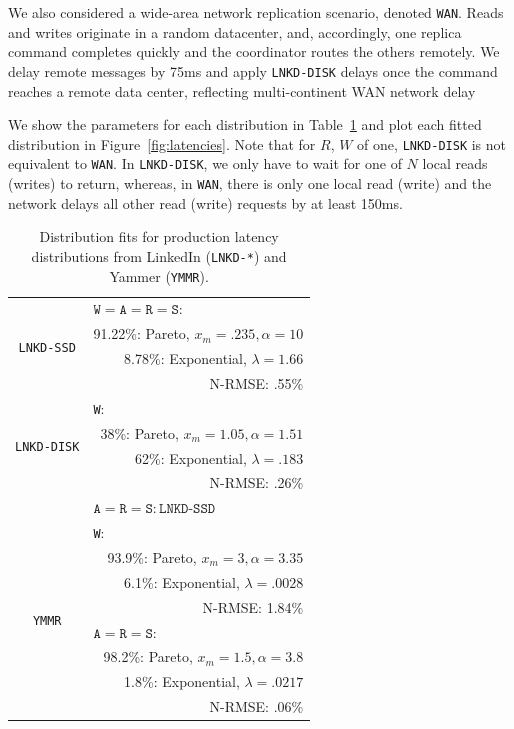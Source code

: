 \documentclass{vldb}
\begin{document}
We also considered a wide-area network replication scenario, denoted
\texttt{WAN}.  Reads and writes originate in a random datacenter, and,
accordingly, one replica command completes quickly and the coordinator
routes the others remotely.  We delay remote messages by 75ms and
apply \texttt{LNKD-DISK} delays once the command reaches a remote data
center, reflecting multi-continent WAN network
delay~\cite{dean-keynote}

We show the parameters for each distribution in Table~\ref{table:fits}
and plot each fitted distribution in Figure~\ref{fig:latencies}.  Note
that for $R$, $W$ of one, \texttt{LNKD-DISK} is not equivalent to
\texttt{WAN}. In \texttt{LNKD-DISK}, we only have to wait for one of
$N$ local reads (writes) to return, whereas, in \texttt{WAN}, there is
only one local read (write) and the network delays all other read
(write) requests by at least 150ms.


\begin{table}
\centering
\begin{tabular}{|c|r|}
\hline
\multirow{4}{*}{\texttt{LNKD-SSD}} & \multicolumn{1}{|l|}{$\texttt{W} = \texttt{A}= \texttt{R} = \texttt{S}:$} \\
& 91.22\%: Pareto, $x_m=.235, \alpha=10$\\
& 8.78\%: Exponential, $\lambda = 1.66$ \\
& N-RMSE: .55\%\\\hline
\multirow{4}{*}{\texttt{LNKD-DISK}} & 
 \multicolumn{1}{|l|}{\texttt{W}:}\\
& 38\%: Pareto, $x_m=1.05, \alpha=1.51$\\
& \hfill 62\%: Exponential, $\lambda = .183$ \\
& N-RMSE: .26\%\\\cline{2-2}
& \multicolumn{1}{|l|}{$\texttt{A}= \texttt{R} = \texttt{S}: \texttt{LNKD-SSD}$}\\
\hline
\multirow{8}{*}{\texttt{YMMR}} & \multicolumn{1}{|l|}{\texttt{W}:} \\
& 93.9\%: Pareto, $x_m=3, \alpha=3.35$\\
& 6.1\%: Exponential, $\lambda = .0028$ \\
& N-RMSE: 1.84\%\\\cline{2-2}
& \multicolumn{1}{|l|}{$\texttt{A}= \texttt{R} = \texttt{S}:$}\\
& 98.2\%: Pareto, $x_m=1.5, \alpha=3.8$\\
& 1.8\%: Exponential, $\lambda=.0217$\\
& N-RMSE: .06\%\\
\hline
\end{tabular}
\vspace{-6pt}
\caption{Distribution fits for production latency distributions from LinkedIn (\texttt{LNKD-*}) and Yammer (\texttt{YMMR}).}
\vspace{-12pt}
\label{table:fits}
\end{table}
\end{document}
